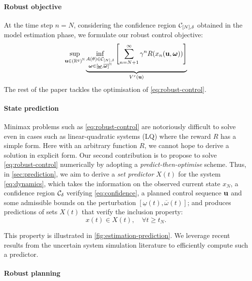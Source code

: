 \documentclass{article}
\begin{document}
\paragraph{Robust objective}

At the time step $n=N$, considering the confidence region $\mathcal{C}_{[N],\delta}$ obtained in the model estimation phase, we formulate our robust control objective:
\begin{equation}
\label{eq:robust-control}
\sup_{\mathbf{u}\in{(\mathbb{R}^q)}^{\mathbb{N}}} \underbrace{\inf_{\substack{A(\theta) \in \mathcal{C}_{[N],\delta} \\ \bm{\omega}\in[\underline{\bm{\omega}},\overline{\bm{\omega}}]^{\mathbb{N}}}} \left[\sum_{n=N+1}^\infty \gamma^n R(x_n(\mathbf{u},\bm{\omega}))\right]}_{V^r(\mathbf{u})}
\end{equation}
The rest of the paper tackles the optimisation of \eqref{eq:robust-control}.

\paragraph{State prediction}

Minimax problems such as \eqref{eq:robust-control} are notoriously difficult to solve even in cases such as linear-quadratic systems (LQ) where the reward $R$ has a simple form. Here with an arbitrary function $R$, we cannot hope to derive a solution in explicit form. Our second contribution is to propose to solve \eqref{eq:robust-control} numerically by adopting a \emph{predict-then-optimise} scheme. Thus, in \autoref{sec:prediction}, we aim to derive a \emph{set predictor} $X(t)$ for the system \eqref{eq:dynamics}, which takes the information on the observed current state ${x}_N$, a confidence region $\mathcal{C}_\delta$ verifying \eqref{eq:confidence}, a planned control sequence $\mathbf{u}$ and some admissible bounds on the perturbation $[\underline{\omega}(t),\overline{\omega}(t)]$; and produces predictions of sets $X(t)$ that verify the inclusion property:
\begin{equation}
 x(t)\in X(t),\quad\forall t\geq t_N.
\end{equation}

This property is illustrated in \autoref{fig:estimation-prediction}. We leverage recent results from the uncertain system simulation literature to efficiently compute such a predictor.

\paragraph{Robust planning}
\end{document}

